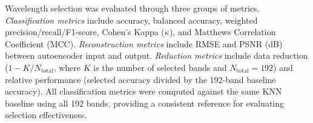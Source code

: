 Wavelength selection was evaluated through three groups of metrics.
\emph{Classification metrics} include accuracy, balanced accuracy, weighted precision/recall/F1-score, Cohen's Kappa ($\kappa$), and Matthews Correlation Coefficient (MCC).
\emph{Reconstruction metrics} include RMSE and PSNR (dB) between autoencoder input and output.
\emph{Reduction metrics} include data reduction ($1 - K/N_{\text{total}}$, where $K$ is the number of selected bands and $N_{\text{total}} = 192$) and relative performance (selected accuracy divided by the 192-band baseline accuracy).
All classification metrics were computed against the same KNN baseline using all 192 bands, providing a consistent reference for evaluating selection effectiveness.
